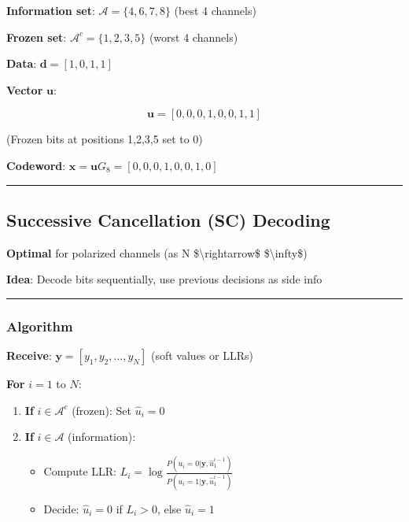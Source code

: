 \textbf{Information set}: \(\mathcal{A} = \{4, 6, 7, 8\}\) (best 4
channels)

\textbf{Frozen set}: \(\mathcal{A}^c = \{1, 2, 3, 5\}\) (worst 4
channels)

\textbf{Data}: \(\mathbf{d} = [1, 0, 1, 1]\)

\textbf{Vector} \(\mathbf{u}\):

\[
\mathbf{u} = [0, 0, 0, 1, 0, 0, 1, 1]
\]

(Frozen bits at positions 1,2,3,5 set to 0)

\textbf{Codeword}:
\(\mathbf{x} = \mathbf{u} G_8 = [0, 0, 0, 1, 0, 0, 1, 0]\)

\begin{center}\rule{0.5\linewidth}{0.5pt}\end{center}

\subsection{Successive Cancellation (SC)
Decoding}\label{successive-cancellation-sc-decoding}

\textbf{Optimal} for polarized channels (as N
\$\textbackslash rightarrow\$ \$\textbackslash infty\$)

\textbf{Idea}: Decode bits sequentially, use previous decisions as side
info

\begin{center}\rule{0.5\linewidth}{0.5pt}\end{center}

\subsubsection{Algorithm}\label{algorithm}

\textbf{Receive}: \(\mathbf{y} = [y_1, y_2, \ldots, y_N]\) (soft values
or LLRs)

\textbf{For} \(i = 1\) to \(N\):

\begin{enumerate}
\def\labelenumi{\arabic{enumi}.}
\item
  \textbf{If} \(i \in \mathcal{A}^c\) (frozen): Set \(\hat{u}_i = 0\)
\item
  \textbf{If} \(i \in \mathcal{A}\) (information):

  \begin{itemize}
  \tightlist
  \item
    Compute LLR:
    \(L_i = \log\frac{P(u_i=0|\mathbf{y}, \hat{u}_1^{i-1})}{P(u_i=1|\mathbf{y}, \hat{u}_1^{i-1})}\)
  \item
    Decide: \(\hat{u}_i = 0\) if \(L_i > 0\), else \(\hat{u}_i = 1\)
  \end{itemize}
\end{enumerate}

